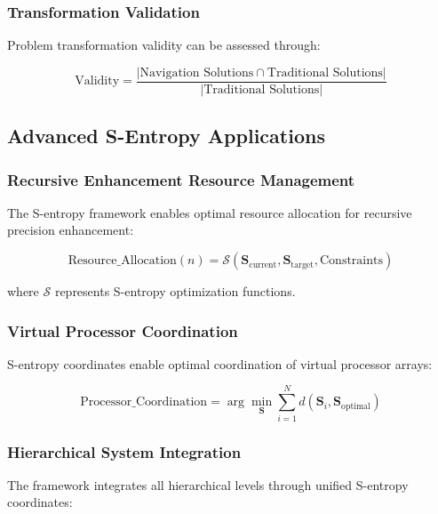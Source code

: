 \documentclass[12pt,a4paper]{article}
\begin{document}
{\subsubsection{Transformation Validation}

Problem transformation validity can be assessed through:

\begin{equation}
\text{Validity} = \frac{|\text{Navigation Solutions} \cap \text{Traditional Solutions}|}{|\text{Traditional Solutions}|}
\label{eq:transformation_validity}
\end{equation}

\subsection{Advanced S-Entropy Applications}

\subsubsection{Recursive Enhancement Resource Management}

The S-entropy framework enables optimal resource allocation for recursive precision enhancement:

\begin{equation}
\text{Resource\_Allocation}(n) = \mathcal{S}(\mathbf{S}_{\text{current}}, \mathbf{S}_{\text{target}}, \text{Constraints})
\end{equation}

where $\mathcal{S}$ represents S-entropy optimization functions.

\subsubsection{Virtual Processor Coordination}

S-entropy coordinates enable optimal coordination of virtual processor arrays:

\begin{equation}
\text{Processor\_Coordination} = \arg\min_{\mathbf{S}} \sum_{i=1}^{N} d(\mathbf{S}_i, \mathbf{S}_{\text{optimal}})
\end{equation}

\subsubsection{Hierarchical System Integration}

The framework integrates all hierarchical levels through unified S-entropy coordinates:

}
\end{document}
